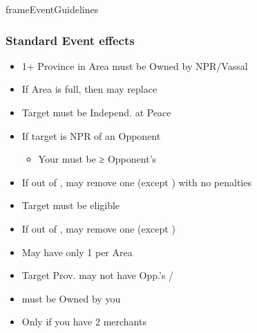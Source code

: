 \documentclass[10pt]{article}
\begin{document}
\begin{dynamiccontents*}{frameEventGuidelines}
\begin{multicols}{2}
		\subsubsection*{Standard Event effects }
		\begin{itemize}
			\item 1+ Province in Area must be Owned by NPR/Vassal
			\item If Area is full, then may replace \influence
		\end{itemize}
		\begin{itemize}
			\item Target must be Independ.  at Peace
			\item If target is NPR \ally of an Opponent
			\begin{itemize}
				\item Your \influence must be ≥ Opponent's \influence
			\end{itemize}
			\item If out of \alliances, may remove one (except \activeally) with no penalties
		\end{itemize}
		\begin{itemize}
			\item Target must be eligible
			\item If out of \marriages, may remove one (except \disputedsuccession)
		\end{itemize}
		\begin{itemize}
			\item May have only 1 per Area
		\end{itemize}
		\begin{itemize}
			\item Target Prov. may not have Opp.'s \town/\vassal
		\end{itemize}
		\begin{itemize}
			\item \town must be Owned by you
		\end{itemize}	
		\begin{itemize}
			\item Only if you have 2 merchants
		\end{itemize}
		\begin{itemize}

\end{itemize}
\end{multicols}
\end{dynamiccontents*}
\end{document}
